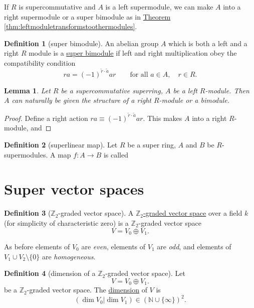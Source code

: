 \documentclass[a4paper,10pt]{scrreprt}
\newcommand{\Z}{\mathbb{Z}}
\newcommand{\N}{\mathbb{N}}
\newcommand{\defn}[1]{\ul{#1}}
\theoremstyle{definition}
\newtheorem{definition}{Definition}[section]
\theoremstyle{plain}
\newtheorem{lemma}{Lemma}[section]
\theoremstyle{remark}
\begin{document}
If $R$ is supercommutative and $A$ is a left supermodule, we can make $A$ into a right supermodule or a super bimodule as in \hyperref[thm:leftmoduletransformstoothermodules]{Theorem \ref*{thm:leftmoduletransformstoothermodules}}.

\begin{definition}[super bimodule]
  \label{def:superbimodule}
  An abelian group $A$ which is both a left and a right $R$ module is a \defn{super bimodule} if left and right multiplication obey the compatibility condition
  \begin{equation*}
    ra = (-1)^{\tilde{r}\cdot \tilde{a}} ar\qquad \text{for all }a\in A,\quad r \in R.
  \end{equation*}
\end{definition}

\begin{lemma}
  Let $R$ be a supercommutative superring, $A$ be a left $R$-module. Then $A$ can naturally be given the structure of a right $R$-module or a bimodule.
\end{lemma}
\begin{proof}
  Define a right action $ra \equiv (-1)^{\tilde{r}\cdot \tilde{a}} ar$. This makes $A$ into a right $R$-module, and 
\end{proof}

\begin{definition}[superlinear map]
  \label{def:superlinear}
  Let $R$ be a super ring, $A$ and $B$ be $R$-supermodules. A map $f\colon A \to B$ is called 
\end{definition}

\section{Super vector spaces}
\begin{definition}[$\Z_{2}$-graded vector space]
  \label{def:z2gradedvectorspace}
  A \defn{$\Z_{2}$-graded vector space} over a field $k$ (for simplicity of characteristic zero) is a $\Z_{2}$-graded vector space
  \begin{equation*}
    V = V_{0} \oplus V_{1}.
  \end{equation*}
\end{definition}
As before elements of $V_{0}$ are \emph{even}, elements of $V_{1}$ are \emph{odd}, and elements of $V_{1} \cup V_{2} \setminus \{0\}$ are \emph{homogeneous}.

\begin{definition}[dimension of a $\Z_{2}$-graded vector space]
  \label{def:dimensionofaz2gradedvectorspace}
  Let 
  \begin{equation*}
    V = V_{0} \oplus V_{1}.
  \end{equation*}
  be a $\Z_{2}$-graded vector space. The \defn{dimension} of $V$ is
  \begin{equation*}
    (\dim V_{0}| \dim V_{1}) \in (\N \cup \{\infty\})^{2}.
  \end{equation*}
\end{definition} 
\end{document}
